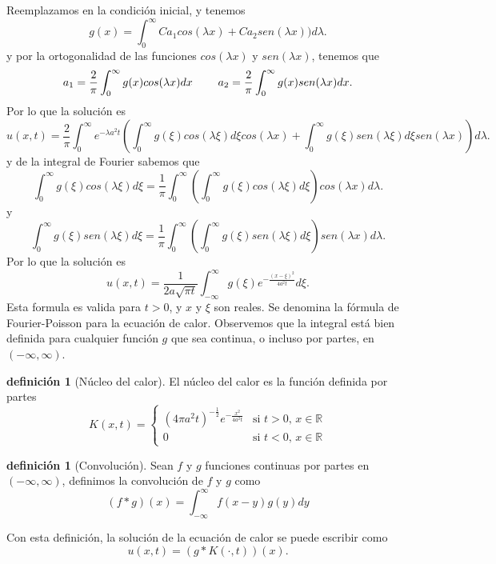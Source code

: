 \documentclass[11pt]{book}
\theoremstyle{plain}
\theoremstyle{definition}
\newtheorem{defi}[proposición]{definición}
\newcommand{\R}{\mathbb{R}}
\begin{document}
Reemplazamos en la condición inicial, y tenemos
\[
g(x) = \int_{0}^{\infty} Ca_{1}cos(\lambda x) + Ca_{2}sen(\lambda x))d\lambda
.\]
y por la ortogonalidad de las funciones $cos(\lambda x)$ y $sen(\lambda x)$, tenemos que
\[
a_{1} = \frac{2}{\pi}\int_{0}^{\infty} g(x)cos(\lambda x)dx \hspace{8mm} a_{2} = \frac{2}{\pi}\int_{0}^{\infty} g(x)sen(\lambda x)dx
.\]
Por lo que la solución es
\[
u(x,t) = \frac{2}{\pi}\int_{0}^{\infty} e^{-\lambda a^{2}t}\left(\int_{0}^{\infty} g(\xi)cos(\lambda \xi)d\xi cos(\lambda x) + \int_{0}^{\infty} g(\xi)sen(\lambda \xi)d\xi sen(\lambda x)\right)d\lambda
.\]
y de la integral de Fourier sabemos que
\[
\int_{0}^{\infty} g(\xi)cos(\lambda \xi)d\xi = \frac{1}{\pi}\int_{0}^{\infty} \left(\int_{0}^{\infty} g(\xi)cos(\lambda \xi)d\xi\right)cos(\lambda x)d\lambda
.\]
y
\[
\int_{0}^{\infty} g(\xi)sen(\lambda \xi)d\xi = \frac{1}{\pi}\int_{0}^{\infty} \left(\int_{0}^{\infty} g(\xi)sen(\lambda \xi)d\xi\right)sen(\lambda x)d\lambda
.\]
Por lo que la solución es
\[
u(x,t) = \frac{1}{2a\sqrt{\pi t}}\int_{-\infty}^{\infty}g(\xi)e^{-\frac{(x-\xi)^{2}}{4a^{2}t}}d\xi
.\]
Esta formula es valida para $t>0$, y $x$ y $\xi$ son reales. Se denomina la fórmula de Fourier-Poisson para la ecuación de calor. Observemos que la integral está bien definida para cualquier función $g$ que sea continua, o incluso por partes, en $(-\infty,\infty)$.

\begin{defi}[Núcleo del calor]
    El núcleo del calor es la función definida por partes
    \[
    K(x,t) = 
    \begin{cases} 
    (4\pi a^{2}t)^{-\frac{1}{2}}e^{-\frac{x^{2}}{4a^{2}t}} & \text{si } t > 0, \, x \in \R \\
    0 & \text{si } t < 0, \, x \in \R
    \end{cases}
    \]
\end{defi}

\begin{defi}[Convolución]
    Sean $f$ y $g$ funciones continuas por partes en $(-\infty,\infty)$, definimos la convolución de $f$ y $g$ como
    \[
    (f*g)(x) = \int_{-\infty}^{\infty} f(x-y)g(y)dy
    \]
\end{defi}

Con esta definición, la solución de la ecuación de calor se puede escribir como
\[
u(x,t) = (g*K(\cdot,t))(x)
.\]
\end{document}
